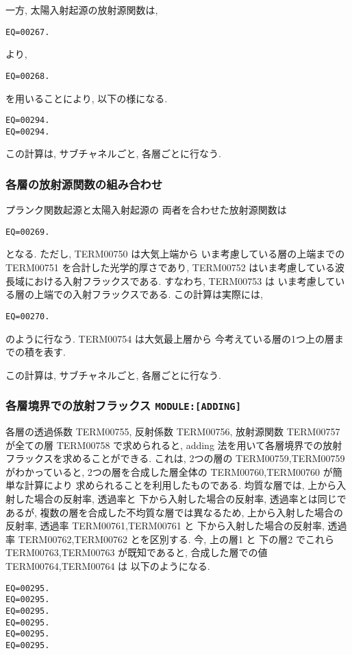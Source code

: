 一方,  太陽入射起源の放射源関数は,
\begin{verbatim}
EQ=00267.
\end{verbatim}
より,
\begin{verbatim}
EQ=00268.
\end{verbatim}
を用いることにより, 以下の様になる.
\begin{verbatim}
EQ=00294.
EQ=00294.
\end{verbatim}

この計算は, サブチャネルごと, 各層ごとに行なう.

\subsubsection{各層の放射源関数の組み合わせ}

プランク関数起源と太陽入射起源の
両者を合わせた放射源関数は
\begin{verbatim}
EQ=00269.
\end{verbatim}
となる. ただし, TERM00750 は大気上端から
いま考慮している層の上端までの
TERM00751 を合計した光学的厚さであり, 
TERM00752 はいま考慮している波長域における入射フラックスである.
すなわち, TERM00753 は
いま考慮している層の上端での入射フラックスである.
%
この計算は実際には, 
\begin{verbatim}
EQ=00270.
\end{verbatim}
のように行なう. TERM00754 は大気最上層から
今考えている層の1つ上の層までの積を表す.

この計算は, サブチャネルごと, 各層ごとに行なう.

\subsubsection{各層境界での放射フラックス \texttt{MODULE:[ADDING]}}

各層の透過係数 TERM00755, 反射係数 TERM00756, 放射源関数 TERM00757
が全ての層 TERM00758 で求められると,
adding 法を用いて各層境界での放射フラックスを求めることができる.
これは, 2つの層の TERM00759,TERM00759 がわかっていると,
2つの層を合成した層全体の TERM00760,TERM00760 が簡単な計算により
求められることを利用したものである.
均質な層では, 上から入射した場合の反射率, 透過率と
下から入射した場合の反射率, 透過率とは同じであるが,
複数の層を合成した不均質な層では異なるため,
上から入射した場合の反射率, 透過率 TERM00761,TERM00761 と
下から入射した場合の反射率, 透過率 TERM00762,TERM00762 とを区別する.
今, 上の層1 と 下の層2 でこれら
TERM00763,TERM00763 が既知であると,
合成した層での値
TERM00764,TERM00764 は
以下のようになる.
\begin{verbatim}
EQ=00295.
EQ=00295.
EQ=00295.
EQ=00295.
EQ=00295.
EQ=00295.
\end{verbatim}

